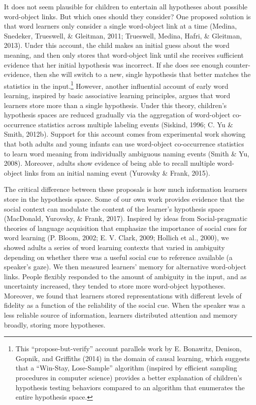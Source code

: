 \documentclass[english,floatsintext,man]{apa6}
\theoremstyle{definition}
\theoremstyle{definition}
\theoremstyle{definition}
\theoremstyle{remark}
\begin{document}
It does not seem plausible for children to entertain all hypotheses
about possible word-object links. But which ones should they consider?
One proposed solution is that word learners only consider a single
word-object link at a time (Medina, Snedeker, Trueswell, \& Gleitman,
2011; Trueswell, Medina, Hafri, \& Gleitman, 2013). Under this account,
the child makes an initial guess about the word meaning, and then only
stores that word-object link until she receives sufficient evidence that
her initial hypothesis was incorrect. If she does see enough
counter-evidence, then she will switch to a new, single hypothesis that
better matches the statistics in the input.\footnote{This
  \enquote{propose-but-verify} account parallels work by E. Bonawitz,
  Denison, Gopnik, and Griffiths (2014) in the domain of causal
  learning, which suggests that a \enquote{Win-Stay, Lose-Sample}
  algorithm (inspired by efficient sampling procedures in computer
  science) provides a better explanation of children's hypothesis
  testing behaviors compared to an algorithm that enumerates the entire
  hypothesis space.} However, another influential account of early word
learning, inspired by basic associative learning principles, argues that
word learners store more than a single hypothesis. Under this theory,
children's hypothesis spaces are reduced gradually via the aggregation
of word-object co-occurrence statistics across multiple labeling events
(Siskind, 1996; C. Yu \& Smith, 2012b). Support for this account comes
from experimental work showing that both adults and young infants can
use word-object co-occurrence statistics to learn word meaning from
individually ambiguous naming events (Smith \& Yu, 2008). Moreover,
adults show evidence of being able to recall multiple word-object links
from an initial naming event (Yurovsky \& Frank, 2015).

The critical difference between these proposals is how much information
learners store in the hypothesis space. Some of our own work provides
evidence that the social context can modulate the content of the
learner's hypothesis space (MacDonald, Yurovsky, \& Frank, 2017).
Inspired by ideas from Social-pragmatic theories of language acquisition
that emphasize the importance of social cues for word learning (P.
Bloom, 2002; E. V. Clark, 2009; Hollich et al., 2000), we showed adults
a series of word learning contexts that varied in ambiguity depending on
whether there was a useful social cue to reference available (a
speaker's gaze). We then measured learners' memory for alternative
word-object links. People flexibly responded to the amount of ambiguity
in the input, and as uncertainty increased, they tended to store more
word-object hypotheses. Moreover, we found that learners stored
representations with different levels of fidelity as a function of the
reliability of the social cue. When the speaker was a less reliable
source of information, learners distributed attention and memory
broadly, storing more hypotheses.
\end{document}
